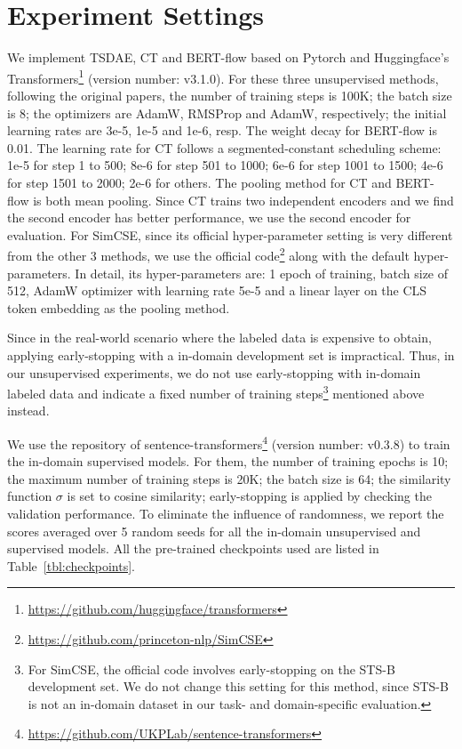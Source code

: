 \documentclass[11pt]{article}
\begin{document}
\section{Experiment Settings}
\label{sec:experiment_settings}
We implement TSDAE, CT and BERT-flow based on Pytorch and Huggingface's Transformers\footnote{\url{https://github.com/huggingface/transformers}} (version number: v3.1.0). For these three unsupervised methods, following the original papers, the number of training steps is 100K; the batch size is 8; the optimizers are AdamW, RMSProp and AdamW, respectively; the initial learning rates are 3e-5, 1e-5 and 1e-6, resp. The weight decay for BERT-flow is 0.01. The learning rate for CT follows a segmented-constant scheduling scheme: 1e-5 for step 1 to 500; 8e-6 for step 501 to 1000; 6e-6 for step 1001 to 1500; 4e-6 for step 1501 to 2000; 2e-6 for others. The pooling method for CT and BERT-flow is both mean pooling. Since CT trains two independent encoders and we find the second encoder has better performance, we use the second encoder for evaluation. For SimCSE, since its official hyper-parameter setting is very different from the other 3 methods, we use the official code\footnote{\url{https://github.com/princeton-nlp/SimCSE}} along with the default hyper-parameters. In detail, its hyper-parameters are: 1 epoch of training, batch size of 512, AdamW optimizer with learning rate 5e-5 and a linear layer on the CLS token embedding as the pooling method.

Since in the real-world scenario where the labeled data is expensive to obtain, applying early-stopping with a in-domain development set is impractical. Thus, in our unsupervised experiments, we do not use early-stopping with in-domain labeled data and indicate a fixed number of training steps\footnote{For SimCSE, the official code involves early-stopping on the STS-B development set. We do not change this setting for this method, since STS-B is not an in-domain dataset in our task- and domain-specific evaluation.} mentioned above instead.

We use the repository of sentence-transformers\footnote{\url{https://github.com/UKPLab/sentence-transformers}} (version number: v0.3.8) to train the in-domain supervised models. For them, the number of training epochs is 10; the maximum number of training steps is 20K; the batch size is 64; the similarity function $\sigma$ is set to cosine similarity; early-stopping is applied by checking the validation performance. To eliminate the influence of randomness, we report the scores averaged over 5 random seeds for all the in-domain unsupervised and supervised models. All the pre-trained checkpoints used are listed in Table~\ref{tbl:checkpoints}.
\end{document}
